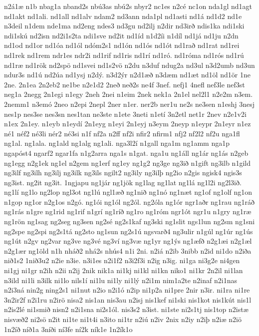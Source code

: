 {n2á1æ
n1b
nbag1a
nband2s
nbú3as
nbú2s
nbyr2
nc1es
n2cé
nc1on
nda1gl
nd1agt
nd1akt
nd1ali.
nd1all
nd1alv
ndam2
nd3ann
nda1pl
nd1asti
nd1á
nd1d2
nd1e
n3deil
n1dem
nde1ma
nd2eng
ndes3
nd3gu
nd2ilj
n2dir
nd3irð
ndis1ka
ndi1ski
ndi1skú
nd2isn
nd2i1s2ta
ndi1sve
nd2it
nd1íd
n1d2íi
n1díl
nd1já
nd1ju
n2dn
nd1od
nd1or
nd1óa
nd1ól
ndóm2s1
nd1ón
nd1ós
nd1ót
nd1rað
nd1rat
nd1rei
nd1rek
nd1rem
ndr1es
ndr2i
nd1rif
nd1ris
nd1rí
nd1ró.
nd1róma
nd1rós
nd1rú
nd1ræ
nd1rök
nd2spö
nd1svei
nd1s2vö
n2du
n3duf
ndug2a
nd3ul
n3d2umb
nd3un
ndur3s
nd1ú
nd2úa
nd1ysj
n2dý.
n3d2ýr
n2d1æð
n3dæm
nd1æt
nd1öl
nd1ör
1ne
2ne.
2n1ea
2n2eb2
ne1be
n2e1d2
2neð
neð2s
ne4f
3nef.
nefj1
4nefl
nef3le
nef3st
neg1a
2negg
2n1egi
n1egy
2neh
2nei
n1eim
2nek
nek1a
2n1el
nel2l1
n2e2m
n3em.
2nemm1
n3emó
2neo
n2epi
2nepl
2ner
n1er.
ner2b
ner1u
ne2s
ne3sen
n1eshj
3nesj
nes1p
nes3se
nes3sn
nes1tan
ne3ste
n1ete
3neti
n1etí
3n2etl
net1r
2nev
n2e1v2i
n1ex
2n1ey.
n1eyb
n1eydí
2n1eyg
n1eyi
2n1eyj
n3eym
2neyp
n1eypr
2n1eyr
n1ez
né1
néf2
né3li
nér2
né3si
n1f
nf2a
n2ff
nf2i
nfir2
nfirm1
nfj2
nf2l2
nf2u
nga1fl
ng1al.
ng1ala.
ng1ald
ng1alg
ng1ali.
nga3l2í
n1gall
nga1m
ng1amm
nga1p
ngapóst4
ngarf2
ngar1fa
n1g2arra
nga1s
n1gat.
nga1u
ng1áll
ng1ár
ng1ás
n2geb
ng1egg
n2g1ek
ng1el
n2gem
ng1erf
ng1ey
ng1g2
ng3ge
ng3ið
n1gift
ng3ilb
n1gild
ng3ilf
ng3ilh
ng3ilj
ng3ilk
ng3ils
ngilt2
ng3ily
ng3ilþ
ng2io
n2gis
ngisk4
ngis3s
ng3ist.
ng2it
ng3it.
1ngjapu
ng1jár
ng1jök
ng1lag
ng1lat
ng1lá
ng1l2i
ng2l3ið.
ng1lí
ng1lo
ng2lop
ngl3ot
ng1lú
ngl1æð
ng1nið
ng1nó
ng1næt
ng1of
ng1olf
ng1on
n1gop
ng1or
n2g1os
n2gó.
ng1ói
ng1ól
ng2ól.
ng2óla
ng1ór
ngr1aðr
ng1rau
ng1ráð
ng1rás
n1gre
ng1rid
ng1rif
n1grí
ng1ríð
ng1ro
ng1róm
ngr1ót
ngr1u
n1gry
ng1ræ
ng1rön
ng1sag
ng2seg
ng3sen
ng2sé
ng2s1kaf
ng3ski
ng1slit
ngs1lun
ng2sm
ng1sni
ng2spe
ng2spi
ng2s1tá
ng2sto
ng1sun
ng2s1ú
ngsvarð4
ng3ulir
n1gúl
ng1úr
ng1ús
ng1út
n2gv
ng2var
ng3ve
ng3vé
ng3ví
ng3væ
ng1yr
ng1ýs
ng1æfð
n2g1æi
n2g1æl
n2g1ær
ng1öld
n1h
nháð2
nhá2s
nhús4
n1i
2ni.
n2iá
n2ib
3nibb
n2id
ni1do
n2iða
nið1s2
1nið3u2
n2ie
n3ie.
n3i1es
n2i1f2
n3i2f3i
n2ig
n3ig.
ni1ga
ni3g2e
ni4gen
ni1gj
ni1gr
n2ih
n2ii
n2ij
2nik
nik1a
ni1kj
ni1kl
ni1kn
niko1
ni1kr
2n2il
ni1lan
n3ild
ni1li
n3ilk
ni1lo
nils1í
ni1lu
ni1ly
ni1lý
n2i1m
nim1a2te
n2inaf
n2i1nas
n2i3ná
nin2g
ning2s1
ni1nut
n2io
n2i1ó
n2ip
ni1p2a
ni1pre
2nir
n3ir.
ni1ra
ni1re
3n2ir2f
n2i1ru
n2irö
nisa2
nis1an
nis3au
n2isj
nis1kef
ni1ski
nis1kot
nis1kút
nis1l
n2is2lé
ni1smið
nisn2
n2i1sna
ni2s1ól.
nis3s2
n3ist.
ni1ste
ni2s1tj
nis1top
n2istæ
nisvæð2
ni2sö
n2it
ni1te
ni1t4i
n3ito
ni1tr
n2iú
n2iv
2nix
n2iy
n2iþ
n2iæ
n2iö
1n2íð
níð1a
3níði
ní3fe
ní2k
ník1e
1n2ík1o
}
